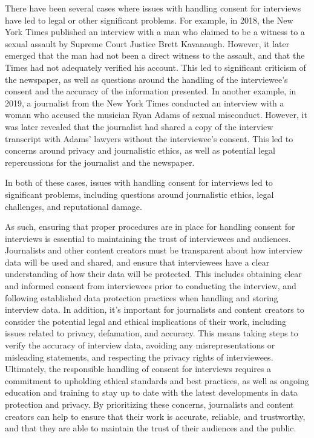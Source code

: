 \documentclass[target=mst,aauheader=]{thud}
\begin{document}
There have been several cases where issues with handling consent for interviews have led to legal or other significant problems. For example, in 2018, the New York Times published an interview with a man who claimed to be a witness to a sexual assault by Supreme Court Justice Brett Kavanaugh\cite{accusationBrettKavanaugh}. However, it later emerged that the man had not been a direct witness to the assault, and that the Times had not adequately verified his account. This led to significant criticism of the newspaper, as well as questions around the handling of the interviewee's consent and the accuracy of the information presented.
In another example, in 2019, a journalist from the New York Times conducted an interview with a woman who accused the musician Ryan Adams of sexual misconduct\cite{accusationRyanAdams}. However, it was later revealed that the journalist had shared a copy of the interview transcript with Adams' lawyers without the interviewee's consent. This led to concerns around privacy and journalistic ethics, as well as potential legal repercussions for the journalist and the newspaper.\par
In both of these cases, issues with handling consent for interviews led to significant problems, including questions around journalistic ethics, legal challenges, and reputational damage.\par
As such, ensuring that proper procedures are in place for handling consent for interviews is essential to maintaining the trust of interviewees and audiences. Journalists and other content creators must be transparent about how interview data will be used and shared, and ensure that interviewees have a clear understanding of how their data will be protected. This includes obtaining clear and informed consent\cite{informedConsent} from interviewees prior to conducting the interview, and following established data protection practices when handling and storing interview data.
In addition, it's important for journalists and content creators to consider the potential legal and ethical implications of their work, including issues related to privacy, defamation, and accuracy. This means taking steps to verify the accuracy of interview data, avoiding any misrepresentations or misleading statements, and respecting the privacy rights of interviewees.
Ultimately, the responsible handling of consent for interviews requires a commitment to upholding ethical standards and best practices, as well as ongoing education and training to stay up to date with the latest developments in data protection and privacy. By prioritizing these concerns, journalists and content creators can help to ensure that their work is accurate, reliable, and trustworthy, and that they are able to maintain the trust of their audiences and the public.
\end{document}
